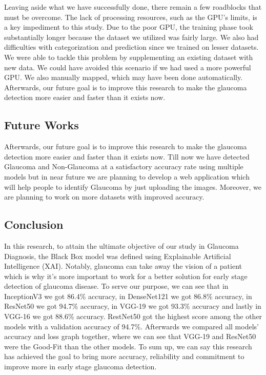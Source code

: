 \documentclass[conference]{IEEEtran}
\begin{document}
Leaving aside what we have successfully done, there remain a few roadblocks that must be overcome. The lack of processing resources, such as the GPU's limits, is a key impediment to this study. Due to the poor GPU, the training phase took substantially longer because the dataset we utilized was fairly large. We also had difficulties with categorization and prediction since we trained on lesser datasets. We were able to tackle this problem by supplementing an existing dataset with new data. We could have avoided this scenario if we had used a more powerful GPU. We also manually mapped, which may have been done automatically. Afterwards, our future goal is to improve this research to make the glaucoma detection more easier and faster than it exists now. 

\subsection{Future Works}

Afterwards, our future goal is to improve this research to make the glaucoma detection more easier and faster than it exists now. Till now we have detected Glaucoma and Non-Glaucoma at a satisfactory accuracy rate using multiple models but in near future we are planning to develop a web application which will help people to identify Glaucoma by just uploading the images. Moreover, we are planning to work on more datasets with improved accuracy. 

\subsection{Conclusion}

In this research, to attain the ultimate objective of our study in Glaucoma Diagnosis, the Black Box model was defined using Explainable Artificial Intelligence (XAI). Notably, glaucoma can take away the vision of a patient which is why it’s more important to work for a better solution for early stage detection of glaucoma disease. To serve our purpose, we can see that in InceptionV3 we got 86.4\% accuracy, in DenseNet121 we got 86.8\% accuracy, in ResNet50 we got 94.7\% accuracy, in VGG-19 we got 93.3\% accuracy and lastly in VGG-16 we got 88.6\% accuracy.  RestNet50 got the highest score among the other models with a validation accuracy of 94.7\%.  Afterwards we compared all models' accuracy and loss graph together, where we can see that VGG-19 and ResNet50 were the Good-Fit than the other models. To sum up, we can say this research has achieved the goal to bring more accuracy, reliability and commitment to improve more in early stage glaucoma detection.
\end{document}
